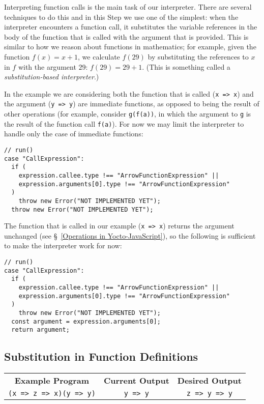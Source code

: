 \documentclass[12pt, oneside]{book}
\begin{document}
\noindent Interpreting function calls is the main task of our interpreter. There are several techniques to do this and in this Step we use one of the simplest: when the interpreter encounters a function call, it substitutes the variable references in the body of the function that is called with the argument that is provided. This is similar to how we reason about functions in mathematics; for example, given the function $f(x) = x + 1$, we calculate $f(29)$ by substituting the references to $x$ in $f$ with the argument $29$: $f(29) = 29 + 1$. (This is something called a \emph{substitution-based interpreter}.)

In the example we are considering both the function that is called (\texttt{x => x}) and the argument (\texttt{y => y}) are immediate functions, as opposed to being the result of other operations (for example, consider \texttt{g(f(a))}, in which the argument to \texttt{g} is the result of the function call \texttt{f(a)}). For now we may limit the interpreter to handle only the case of immediate functions:

\begin{verbatim}
// run()
case "CallExpression":
  if (
    expression.callee.type !== "ArrowFunctionExpression" ||
    expression.arguments[0].type !== "ArrowFunctionExpression"
  )
    throw new Error("NOT IMPLEMENTED YET");
  throw new Error("NOT IMPLEMENTED YET");
\end{verbatim}

The function that is called in our example (\texttt{x => x}) returns the argument unchanged (see §~\ref{Operations in Yocto-JavaScript}), so the following is sufficient to make the interpreter work for now:

\begin{verbatim}
// run()
case "CallExpression":
  if (
    expression.callee.type !== "ArrowFunctionExpression" ||
    expression.arguments[0].type !== "ArrowFunctionExpression"
  )
    throw new Error("NOT IMPLEMENTED YET");
  const argument = expression.arguments[0];
  return argument;
\end{verbatim}

\subsection{Substitution in Function Definitions}
\label{Substitution in Function Definitions}

\begin{center}
\begin{tabular}{c|c|c}
\textbf{Example Program} & \textbf{Current Output} & \textbf{Desired Output} \\
\texttt{(x => z => x)(y => y)} & \texttt{y => y} & \texttt{z => y => y} \\
\end{tabular}
\end{center}
\end{document}
